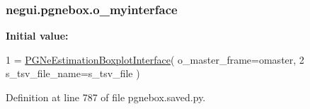 \subsubsection[{\texorpdfstring{o\+\_\+myinterface}{o_myinterface}}]{\setlength{\rightskip}{0pt plus 5cm}negui.\+pgnebox.\+o\+\_\+myinterface}\hypertarget{namespacenegui_1_1pgnebox_ad325fc694cb440bbfcaf4b9bdac82aa1}{}\label{namespacenegui_1_1pgnebox_ad325fc694cb440bbfcaf4b9bdac82aa1}
{\bfseries Initial value\+:}
\begin{DoxyCode}
1 = \hyperlink{classnegui_1_1pgnebox_1_1PGNeEstimationBoxplotInterface}{PGNeEstimationBoxplotInterface}( o\_master\_frame=omaster,
2                                                     s\_tsv\_file\_name=s\_tsv\_file )
\end{DoxyCode}


Definition at line 787 of file pgnebox.\+saved.\+py.

